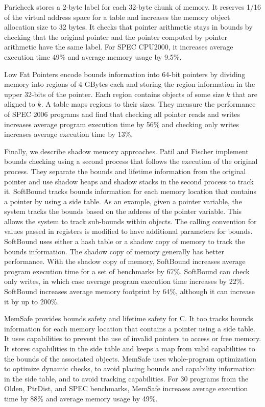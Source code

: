 Paricheck \cite{Younan2010} stores a 2-byte label for each 32-byte chunk of memory.
It reserves 1/16 of the virtual address space for a table and increases
the memory object allocation size to 32 bytes.
It checks that pointer arithmetic stays in bounds by checking that the
original pointer and the pointer computed by pointer arithmetic have the
same label. For SPEC CPU2000, it increases average execution time 49\% and
average  memory usage by 9.5\%.

Low Fat Pointers \cite{Duck2016} encode bounds information into 64-bit pointers by
dividing memory into  regions of 4 GBytes each and storing
the region information in the upper 32-bits of the pointer.  Each
region contains objects of some size $k$ that are aligned to $k$.
A table maps regions to their sizes.  They measure the performance of 
SPEC 2006 programs and find that checking all pointer reads and writes
increases average program execution time by 56\% and checking only writes 
increases average execution time by 13\%.

Finally, we describe shadow memory approaches.
Patil and Fischer \cite{Patil1997}
implement bounds checking using a second process that follows the execution 
of the original process.  They separate the bounds and lifetime information
from the original pointer and use shadow heaps and shadow stacks in the
second process to track it.  
SoftBound \cite{Nagarakatte2009} tracks bounds information
for each  memory location that contains a pointer by using a side table.  
As an example, given a pointer variable,
the system tracks the bounds based on the address of the pointer variable.
This allows the system to track sub-bounds within objects.  The calling
convention for values passed in registers is modified to have additional
parameters for bounds.  SoftBound uses either a hash table or
a shadow copy of memory to track the bounds information.   The shadow
copy of memory generally has better performance.  With the shadow
copy of memory, SoftBound increases average program execution time for
a set of benchmarks by 67\%.   SoftBound can check only writes, in which
case average program execution time increases by 22\%.   SoftBound increases 
average memory footprint by 64\%, although it can increase it by up to 200\%.

MemSafe \cite{Simpson2013} provides bounds safety and lifetime safety for C.
It too tracks bounds information for each memory location that contains a 
pointer using a side table.  It uses capabilities to prevent the use of
invalid pointers to access or free memory.  It stores capabilities in the side 
table and keeps a map from valid capabilities to the bounds of the associated objects.
MemSafe uses whole-program optimization to optimize dynamic checks, to avoid placing bounds and capability information in the side table, and to avoid tracking 
capabilities. For 30 programs from the Olden, 
PtrDist, and SPEC benchmarks, MemSafe increases average execution time by 88\%
and average memory usage by 49\%.

